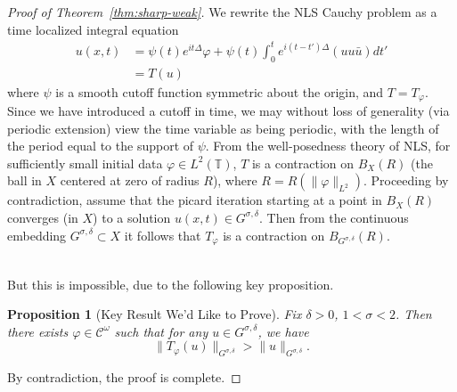 \documentclass[12pt,reqno]{amsart}
\numberwithin{equation}{section}  %
\newcommand{\ci}{\mathbb{T}}
\newcommand{\vp}{\varphi}
\newtheorem{proposition}[theorem]{Proposition}
\begin{document}
\begin{proof}[Proof of Theorem~\ref{thm:sharp-weak}]
  We rewrite the NLS Cauchy problem as a time localized integral equation   
  \begin{equation*}
    \begin{split}
      u(x,t)
      & = \psi(t) e^{it \Delta} \vp + \psi(t)
      \int_{0}^{t} e^{i(t - t') \Delta}(u u \bar{u})
      dt'
      \\
      & = T(u)
    \end{split}
  \end{equation*}
  where $\psi$ is a smooth
  cutoff function symmetric about the origin, and $T = T_{\vp}$. Since we have
  introduced a cutoff in time, we may without loss of generality
  (via periodic extension) view the time
  variable as being periodic, with the length of the period equal to the support
  of $\psi$. From the well-posedness theory of NLS, for sufficiently small initial
  data $\vp \in L^{2}(\ci)$, $T$ is a contraction on
  $B_{X}(R)$ (the ball in $X$ centered at zero of radius $R$), where $R =
  R(\|\vp \|_{L^{2}})$. Proceeding by contradiction, assume that the picard
  iteration starting at a point in $B_{X}(R)$ converges (in $X$)
  to a solution $u(x,t) \in G^{\sigma, \delta}$.
  Then from the continuous embedding $G^{\sigma, \delta} \subset X$ it follows
  that $T_{\vp}$ is a contraction on $B_{G^{\sigma, \delta}}(R)$. 
  \\
  \\
  \begin{center}
  \end{center}
  But this is
  impossible, due to the following key proposition.
  \begin{proposition}[Key Result We'd Like to Prove]
      Fix $\delta > 0$, $1 < \sigma < 2$. Then there exists
      $\vp \in \mathcal{C}^{\omega}$ such that for
      any $u \in G^{\sigma, \delta}$, we have
      \begin{equation}
          \| T_{\vp}(u) \|_{G^{\sigma, \delta}} > \|u \|_{G^{\sigma, \delta}}.
      \end{equation}
      \label{prop:non-cont}
  \end{proposition}
  By contradiction, the proof is complete. 
\end{proof}
\end{document}
